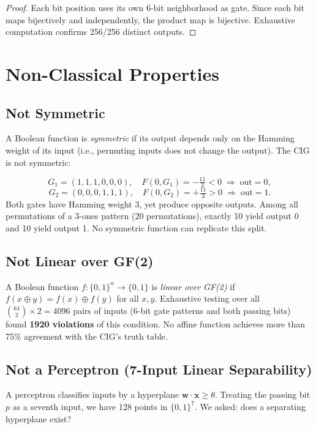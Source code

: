 \documentclass[10pt,a4paper]{article}
\begin{document}
\begin{proof}
Each bit position uses its own 6-bit neighborhood as gate. Since each bit
maps bijectively and independently, the product map is bijective.
Exhaustive computation confirms 256/256 distinct outputs.
\end{proof}

\section{Non-Classical Properties}

\subsection{Not Symmetric}

A Boolean function is \emph{symmetric} if its output depends only on the
Hamming weight of its input (i.e., permuting inputs does not change the output).
The CIG is not symmetric:

\[
  G_1 = (1,1,1,0,0,0),\quad F(0,G_1) = -\tfrac{11}{3} < 0 \;\Rightarrow\; \mathrm{out}=0,
\]
\[
  G_2 = (0,0,0,1,1,1),\quad F(0,G_2) = +\tfrac{11}{3} > 0 \;\Rightarrow\; \mathrm{out}=1.
\]
Both gates have Hamming weight 3, yet produce opposite outputs. Among all
permutations of a 3-ones pattern (20 permutations), exactly 10 yield output 0
and 10 yield output 1. No symmetric function can replicate this split.

\subsection{Not Linear over GF(2)}

A Boolean function $f:\{0,1\}^n\to\{0,1\}$ is \emph{linear over GF(2)} if
$f(x\oplus y)=f(x)\oplus f(y)$ for all $x,y$. Exhaustive testing over all
$\binom{64}{2}\times 2 = 4096$ pairs of inputs (6-bit gate patterns and both
passing bits) found \textbf{1920 violations} of this condition. No affine
function achieves more than 75\% agreement with the CIG's truth table.

\subsection{Not a Perceptron (7-Input Linear Separability)}

A perceptron classifies inputs by a hyperplane $\mathbf{w}\cdot\mathbf{x} \ge \theta$.
Treating the passing bit $p$ as a seventh input, we have 128 points in
$\{0,1\}^7$. We asked: does a separating hyperplane exist?
\end{document}
